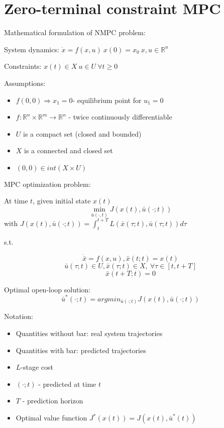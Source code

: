 \section{Zero-terminal constraint MPC}

Mathematical formulation of NMPC problem:

System dynamics: $\dot x = f(x,u) \ x(0) = x_0 \ x,u \in \mathbb{R}^n$

Constraints: $x(t) \in X \ u \in U \ \forall t \geq 0$

Assumptions:
\begin{itemize}
\item $f(0,0) \Rightarrow x_1=0 $- equilibrium point for $u_1 = 0$
\item $f: \mathbb{R}^n \times \mathbb{R}^m \to \mathbb{R}^n$ - twice continuously differentiable
\item $U$ is a compact set (closed and bounded)
\item $X$ is a connected and closed set
\item $(0,0) \in int(X \times U)$ 
\end{itemize}

MPC optimization problem:

At time $t$, given initial state $x(t)$
\begin{equation*}
\min_{\bar u(\cdot,t)} J(x(t),\bar u(\cdot ;t))
\end{equation*}
with $J(x(t),\bar u(\cdot;t)) = \int_{t}^{t+T}L(\bar x(\tau;t),\bar u(\tau;t))d\tau$

s.t.

\begin{equation*}
\dot{\bar x} = f(x,u), \bar x(t;t) = x(t)
\end{equation*}
\begin{equation*}
\bar u(\tau;t) \in U, \bar x(\tau;t) \in X, \  \forall \tau \in [t, t +T] 
\end{equation*}
\begin{equation*}
\bar x(t+T;t) = 0
\end{equation*}

Optimal open-loop solution: 
\begin{equation*}
\bar u^* (\cdot;t) = arg min_{\bar u(\cdot;t)} J(x(t), \bar u(\cdot; t))
\end{equation*}

Notation:
\begin{itemize}
\item Quantities without bar: real system trajectories
\item Quantities with bar: predicted trajectories
\item $L$-stage cost
\item $(\cdot;t)$ - predicted at time $t$
\item $T$ - prediction horizon
\item Optimal value function $J^*(x(t)) = J(x(t), \bar u^*(t))$
\end{itemize}

